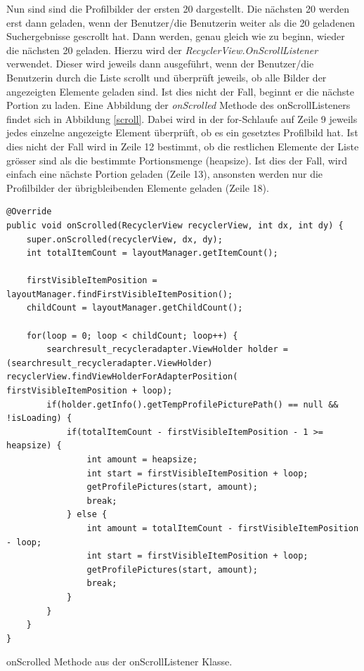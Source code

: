 \documentclass[a4paper,11pt]{report}
\newenvironment{code}{\captionsetup{type=figure}}{}
\begin{document}
		Nun sind sind die Profilbilder der ersten 20 dargestellt. Die nächsten 20 werden erst dann geladen, wenn der Benutzer/die Benutzerin weiter als die 20 geladenen Suchergebnisse gescrollt hat. Dann werden, genau gleich wie zu beginn, wieder die nächsten 20 geladen. Hierzu wird der \emph{RecyclerView.OnScrollListener} verwendet. Dieser wird jeweils dann ausgeführt, wenn der Benutzer/die Benutzerin durch die Liste scrollt und überprüft jeweils, ob alle Bilder der angezeigten Elemente geladen sind. Ist dies nicht der Fall, beginnt er die nächste Portion zu laden. Eine Abbildung der \emph{onScrolled} Methode des onScrollListeners findet sich in Abbildung \ref{scroll}. Dabei wird in der for-Schlaufe auf Zeile 9 jeweils jedes einzelne angezeigte Element überprüft, ob es ein gesetztes Profilbild hat. Ist dies nicht der Fall wird in Zeile 12 bestimmt, ob die restlichen Elemente der Liste grösser sind als die bestimmte Portionsmenge (heapsize). Ist dies der Fall, wird einfach eine nächste Portion geladen (Zeile 13), ansonsten werden nur die Profilbilder der übrigbleibenden Elemente geladen (Zeile 18).

\begin{code}
	\begin{center}
		\begin{verbatim}
@Override
public void onScrolled(RecyclerView recyclerView, int dx, int dy) {
	super.onScrolled(recyclerView, dx, dy);
	int totalItemCount = layoutManager.getItemCount();

	firstVisibleItemPosition = layoutManager.findFirstVisibleItemPosition();
	childCount = layoutManager.getChildCount();

	for(loop = 0; loop < childCount; loop++) {
		searchresult_recycleradapter.ViewHolder holder = (searchresult_recycleradapter.ViewHolder) recyclerView.findViewHolderForAdapterPosition( firstVisibleItemPosition + loop);
		if(holder.getInfo().getTempProfilePicturePath() == null && !isLoading) {
			if(totalItemCount - firstVisibleItemPosition - 1 >= heapsize) {
				int amount = heapsize;
				int start = firstVisibleItemPosition + loop;
				getProfilePictures(start, amount);
				break;
			} else {
				int amount = totalItemCount - firstVisibleItemPosition - loop;
				int start = firstVisibleItemPosition + loop;
				getProfilePictures(start, amount);
				break;
			}
		}
	}
}
		\end{verbatim}
	\end{center}
	\caption{onScrolled Methode aus der onScrollListener Klasse.}
	\label{refresh}
\end{code}
\end{document}
